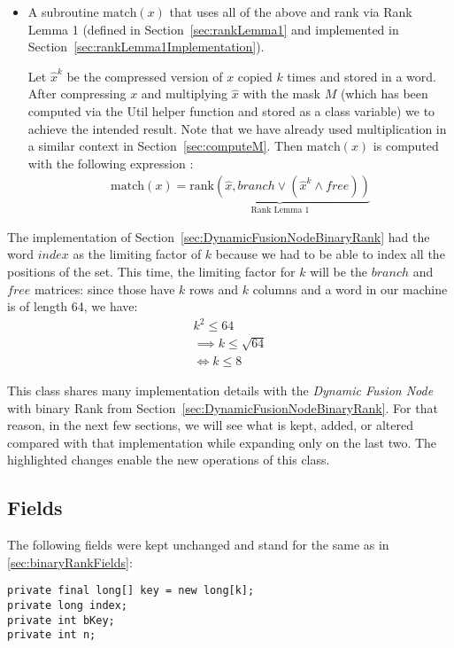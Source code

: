 \begin{itemize}
    \item
    A subroutine $\text{match}(x)$ that uses all of the above and rank via Rank Lemma 1 (defined in Section~\ref{sec:rankLemma1} and implemented in Section~\ref{sec:rankLemma1Implementation}).
    
    Let $\hat x^k$ be the compressed version of $x$ copied $k$ times and stored in a word. After compressing $x$ and multiplying $\hat x$ with the mask $M$ (which has been computed via the {\ttfamily Util} helper function and stored as a class variable) we to achieve the intended result. Note that we have already used multiplication in a similar context in Section~\ref{sec:computeM}.
    Then $\text{match}(x)$ is computed with the following expression \cite{patrascu2014dynamic}:
    \begin{align*}
        \text{match}(x) = \underbrace{\text{rank}(\hat x, branch \vee (\hat x^k \wedge free))}_{\text{Rank Lemma 1}}
    \end{align*}
\end{itemize}

The implementation of Section~\ref{sec:DynamicFusionNodeBinaryRank} had the word $index$ as the limiting factor of $k$ because we had to be able to index all the positions of the set. This time, the limiting factor for $k$ will be the $branch$ and $free$ matrices: since those have $k$ rows and $k$ columns and a word in our machine is of length 64, we have:
\begin{align*}
    k^2 \leq 64\\
    \implies k \leq \sqrt{64}\\
    \iff k \leq 8
\end{align*}

This class shares many implementation details with the \textit{Dynamic Fusion Node} with binary Rank from Section~\ref{sec:DynamicFusionNodeBinaryRank}. For that reason, in the next few sections, we will see what is kept, added, or altered compared with that implementation while expanding only on the last two. The highlighted changes enable the new operations of this class.

\subsection{Fields} \label{sec:dontCaresRankFields}
The following fields were kept unchanged and stand for the same as in \ref{sec:binaryRankFields}:
\begin{lstlisting}
private final long[] key = new long[k];
private long index;
private int bKey;
private int n;
\end{lstlisting}

